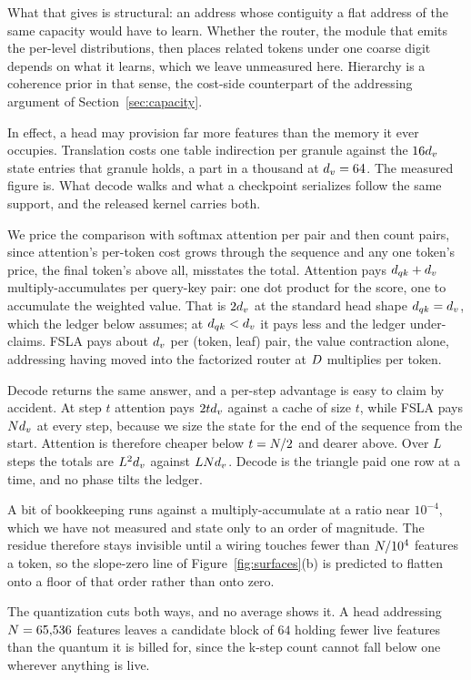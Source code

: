 What that gives is structural: an address whose contiguity a flat address of the same capacity would have to learn. Whether the router, the module that emits the per-level distributions, then places related tokens under one coarse digit depends on what it learns, which we leave unmeasured here. Hierarchy is a coherence prior in that sense, the cost-side counterpart of the addressing argument of Section~\ref{sec:capacity}.

In effect, a head may provision far more features than the memory it ever occupies. Translation costs one table indirection per granule against the $16d_v$ state entries that granule holds, a part in a thousand at $d_v = 64$. The measured figure is. What decode walks and what a checkpoint serializes follow the same support, and the released kernel carries both.

We price the comparison with softmax attention per pair and then count pairs, since attention's per-token cost grows through the sequence and any one token's price, the final token's above all, misstates the total. Attention pays $d_{qk} + d_v$ multiply-accumulates per query-key pair: one dot product for the score, one to accumulate the weighted value. That is $2d_v$ at the standard head shape $d_{qk} = d_v$, which the ledger below assumes; at $d_{qk} < d_v$ it pays less and the ledger under-claims. FSLA pays about $d_v$ per (token, leaf) pair, the value contraction alone, addressing having moved into the factorized router at $D$ multiplies per token.

Decode returns the same answer, and a per-step advantage is easy to claim by accident. At step $t$ attention pays $2td_v$ against a cache of size $t$, while FSLA pays $Nd_v$ at every step, because we size the state for the end of the sequence from the start. Attention is therefore cheaper below $t = N/2$ and dearer above. Over $L$ steps the totals are $L^2d_v$ against $LNd_v$. Decode is the triangle paid one row at a time, and no phase tilts the ledger.

A bit of bookkeeping runs against a multiply-accumulate at a ratio near $10^{-4}$, which we have not measured and state only to an order of magnitude. The residue therefore stays invisible until a wiring touches fewer than $N / 10^{4}$ features a token, so the slope-zero line of Figure~\ref{fig:surfaces}(b) is predicted to flatten onto a floor of that order rather than onto zero.

The quantization cuts both ways, and no average shows it. A head addressing $N = 65{,}536$ features leaves a candidate block of $64$ holding fewer live features than the quantum it is billed for, since the k-step count cannot fall below one wherever anything is live.

